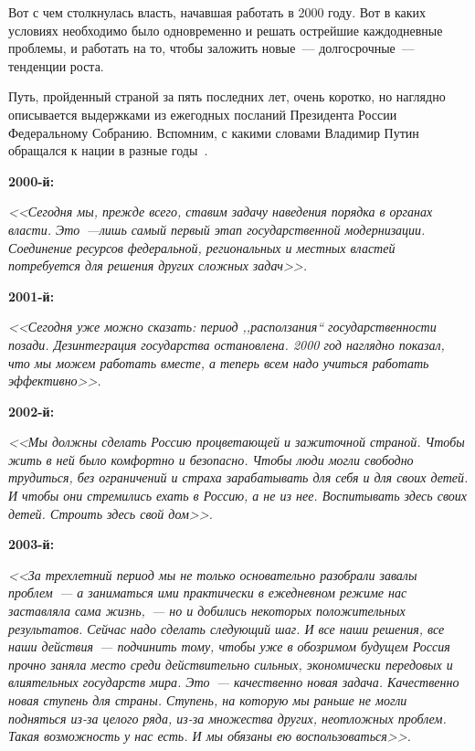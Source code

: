 \documentclass[article, 12pt, russian, oneside]{ncc}
\begin{document}
Вот с чем столкнулась власть, начавшая работать в 2000 году. Вот в
каких условиях необходимо было одновременно и решать острейшие
каждодневные проблемы, и работать на то, чтобы заложить новые~---
долгосрочные~--- тенденции роста.

Путь, пройденный страной за пять последних лет, очень коротко, но
наглядно описывается выдержками из ежегодных посланий Президента
России Федеральному Собранию. Вспомним, с какими словами Владимир
Путин обращался к нации в разные годы~\cite{NPR_Idea}. 
\newline


\textbf{2000-й:}

  \emph{<<Сегодня мы, прежде всего, ставим задачу наведения порядка в
    органах власти. Это~---лишь самый первый этап государственной
    модернизации. Соединение ресурсов федеральной, региональных и
    местных властей потребуется для решения других сложных задач>>.}


\textbf{2001-й:}

  \emph{<<Сегодня уже можно сказать: период ,,расползания``
    государственности позади. Дезинтеграция государства
    остановлена. 2000 год наглядно показал, что мы можем работать
    вместе, а теперь всем надо учиться работать эффективно>>.}


\textbf{2002-й:}

  \emph{<<Мы должны сделать Россию процветающей и зажиточной
    страной. Чтобы жить в ней было комфортно и безопасно. Чтобы люди
    могли свободно трудиться, без ограничений и страха зарабатывать
    для себя и для своих детей. И чтобы они стремились ехать в Россию,
    а не из нее. Воспитывать здесь своих детей. Строить здесь свой
    дом>>.}


\textbf{2003-й:}

  \emph{<<За трехлетний период мы не только основательно разобрали
    завалы проблем~--- а заниматься ими практически в ежедневном
    режиме нас заставляла сама жизнь,~--- но и добились некоторых
    положительных результатов. Сейчас надо сделать следующий шаг. И
    все наши решения, все наши действия~--- подчинить тому, чтобы уже
    в обозримом будущем Россия прочно заняла место среди действительно
    сильных, экономически передовых и влиятельных государств
    мира. Это~--- качественно новая задача. Качественно новая ступень
    для страны. Ступень, на которую мы раньше не могли подняться из-за
    целого ряда, из-за множества других, неотложных проблем. Такая
    возможность у нас есть. И мы обязаны ею воспользоваться>>.}
\end{document}
